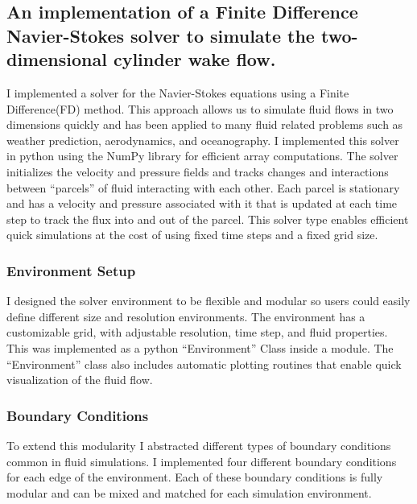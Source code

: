 

\subsection{An implementation of a Finite Difference Navier-Stokes solver to simulate the two-dimensional cylinder wake flow.}
I implemented a solver for the Navier-Stokes equations using a Finite Difference(FD) method.
This approach allows us to simulate fluid flows in two dimensions quickly and has been applied to many fluid related problems such as weather prediction, aerodynamics, and oceanography.
I implemented this solver in python using the NumPy library for efficient array computations.
The solver initializes the velocity and pressure fields and tracks changes and interactions between ``parcels'' of fluid interacting with each other.
Each parcel is stationary and has a velocity and pressure associated with it that is updated at each time step to track the flux into and out of the parcel.
This solver type enables efficient quick simulations at the cost of using fixed time steps and a fixed grid size.


\subsubsection{Environment Setup}
I designed the solver environment to be flexible and modular so users could easily define different size and resolution environments.
The environment has a customizable grid, with adjustable resolution, time step, and fluid properties.
This was implemented as a python ``Environment'' Class inside a module.
The ``Environment'' class also includes automatic plotting routines that enable quick visualization of the fluid flow.

\subsubsection{Boundary Conditions}
To extend this modularity I abstracted different types of boundary conditions common in fluid simulations.
I implemented four different boundary conditions for each edge of the environment.
Each of these boundary conditions is fully modular and can be mixed and matched for each simulation environment.

